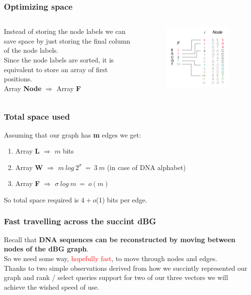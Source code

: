 \begin{frame}
\frametitle{Optimizing space}
\begin{columns}
	Instead of storing the node labels we can save space by just storing the final column of the node labels.
	\\ \medskip
	Since the node labels are sorted, it is equivalent to store an array of first positions. \\ \medskip
	Array \textbf{Node} $\Rightarrow$ Array \textbf{F}
	\begin{figure}
		\includegraphics[scale=0.5]{img/f-array.png}
	\end{figure}
\end{columns}
\end{frame}

\begin{frame}
\frametitle{Total space used}
Assuming that our graph has \textbf{m} edges we get:
\begin{enumerate}
	\item Array \textbf{L} $\Rightarrow$ $m$ bits
	\item Array \textbf{W} $\Rightarrow$ $m\ log\ 2^\sigma\ =\ 3\ m$ (in case of DNA alphabet)
	\item Array \textbf{F} $\Rightarrow$ $\sigma\ log\ m\ =\ o(m)$
\end{enumerate}
So total space required is  $4+o$(1) bits per edge. 
\end{frame}



\begin{frame}
\frametitle{Fast travelling across the succint dBG}
Recall that \textbf{DNA sequences can be reconstructed by moving between nodes of the dBG graph}.
\\ \medskip
So we need some way, \textcolor{red}{hopefully fast}, to move through nodes and edges.
\\ \medskip
Thanks to two simple observations derived from how we succintly represented our graph and rank / select queries support for two of our three vectors we will achieve the wished speed of use.
\end{frame}

